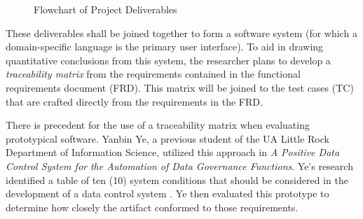 \begin{figure}[ht]
\centering
{}
\caption{Flowchart of Project Deliverables}
\label{fig:deliverable-plan}
\end{figure}


These deliverables shall be joined together to form a software system (for which a domain-specific language is the primary user interface). To aid in drawing quantitative conclusions from this system, the researcher plans to develop a \textit{traceability matrix} from the requirements contained in the functional requirements document (FRD). This matrix will be joined to the test cases (TC) that are crafted directly from the requirements in the FRD. 

There is precedent for the use of a traceability matrix when evaluating prototypical software. Yanbin Ye, a previous student of the UA Little Rock Department of Information Science, utilized this approach in \textit{A Positive Data Control System for the Automation of Data Governance Functions}. Ye’s research identified a table of ten (10) system conditions that should be considered in the development of a data control system \cite{yanbin-ye}. Ye then evaluated this prototype to determine how closely the artifact conformed to those requirements. 

